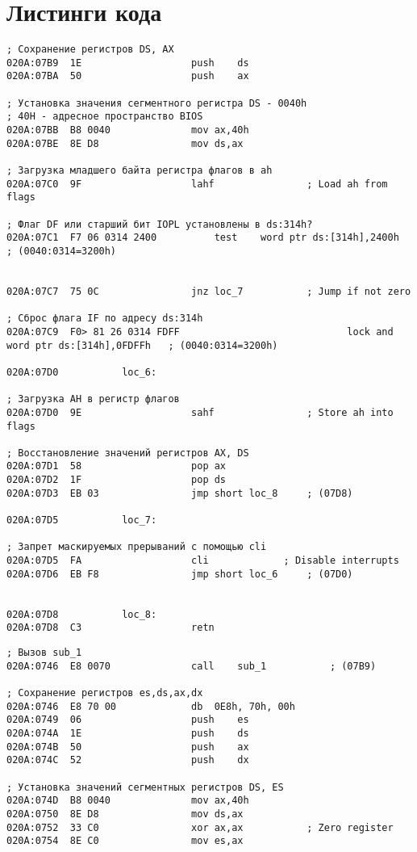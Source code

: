 \chapter{Листинги кода}
\begin{center}

\begin{lstlisting}[style={asm}, caption= sub\_1]
; Сохранение регистров DS, AX
020A:07B9  1E					push	ds
020A:07BA  50					push	ax

; Установка значения сегментного регистра DS - 0040h
; 40H - адресное пространство BIOS
020A:07BB  B8 0040				mov	ax,40h
020A:07BE  8E D8				mov	ds,ax

; Загрузка младшего байта регистра флагов в ah
020A:07C0  9F					lahf				; Load ah from flags

; Флаг DF или старший бит IOPL установлены в ds:314h?
020A:07C1  F7 06 0314 2400			test	word ptr ds:[314h],2400h	; (0040:0314=3200h)


020A:07C7  75 0C				jnz	loc_7			; Jump if not zero

; Сброс флага IF по адресу ds:314h
020A:07C9  F0> 81 26 0314 FDFF	                           lock	and	word ptr ds:[314h],0FDFFh	; (0040:0314=3200h)

020A:07D0			loc_6:

; Загрузка AH в регистр флагов
020A:07D0  9E					sahf				; Store ah into flags

; Восстановление значений регистров AX, DS
020A:07D1  58					pop	ax
020A:07D2  1F					pop	ds
020A:07D3  EB 03				jmp	short loc_8		; (07D8)

020A:07D5			loc_7:

; Запрет маскируемых прерываний с помощью cli
020A:07D5  FA					cli				; Disable interrupts
020A:07D6  EB F8				jmp	short loc_6		; (07D0)


020A:07D8			loc_8:
020A:07D8  C3					retn
\end{lstlisting}
\pagebreak

\begin{lstlisting}[style={asm}, caption = Прерывание int 8h]
; Вызов sub_1
020A:0746  E8 0070				call	sub_1			; (07B9)

; Сохранение регистров es,ds,ax,dx
020A:0746  E8 70 00				db	0E8h, 70h, 00h
020A:0749  06					push	es
020A:074A  1E					push	ds
020A:074B  50					push	ax
020A:074C  52					push	dx

; Установка значений сегментных регистров DS, ES
020A:074D  B8 0040				mov	ax,40h
020A:0750  8E D8				mov	ds,ax
020A:0752  33 C0				xor	ax,ax			; Zero register
020A:0754  8E C0				mov	es,ax


\end{lstlisting}
\end{center}
